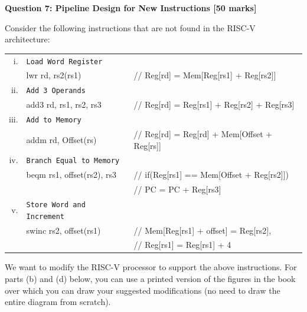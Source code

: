 \documentclass[addpoints]{exam}
\begin{document}
\begin{sloppypar}
\begin{questions}
    \pagebreak
    \question[50]
    \begin{center}
        \textbf{Question 7: Pipeline Design for New Instructions [50 marks]}
    \end{center}

    Consider the following instructions that are not found in the RISC-V architecture:

    \begin{tabular}{r  l  l }
        i. & \texttt{Load Word Register} &  \\
        &  \textrm{lwr rd, rs2(rs1)} & // Reg[rd] = Mem[Reg[rs1] + Reg[rs2]] \\ 
        ii. & \texttt{Add 3 Operands} & \\ 
        & \textrm{add3 rd, rs1, rs2, rs3} & // Reg[rd] = Reg[rs1] + Reg[rs2] + Reg[rs3] \\ 
        iii. & \texttt{Add to Memory} & \\ 
        & \textrm{addm rd, Offset(rs)} & // Reg[rd] = Reg[rd] + Mem[Offset + Reg[rs]] \\ 
        iv. & \texttt{Branch Equal to Memory} & \\ 
        & \textrm{beqm rs1, offset(rs2), rs3} & // if(Reg[rs1] == Mem[Offset + Reg[rs2]]) \\ 
        & & //\hspace*{10mm} PC = PC + Reg[rs3] \\ 
        v. & \texttt{Store Word and Increment} & \\ 
        & \textrm{swinc rs2, offset(rs1)} & // Mem[Reg[rs1] + offset] = Reg[rs2], \\ & & // Reg[rs1] = Reg[rs1] + 4 \\         
    \end{tabular}

    We want to modify the RISC-V processor to support the above instructions. For parts (b) and (d) below, you can use a printed version of the figures in the book over which you can draw your suggested modifications (no need to draw the entire diagram from scratch).


\end{questions}
\end{sloppypar}
\end{document}
